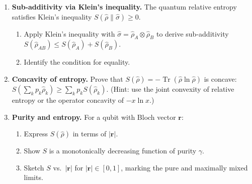 \documentclass[11pt,a4paper]{article}
\begin{document}
\begin{tcolorbox}[gradprobbox, title={Part B --- Entropy and Information \hfill\normalfont 3 problems}]

\begin{enumerate}[leftmargin=1.8em, label=\textbf{B\arabic*.}, itemsep=12pt]

\item {}
  \textbf{Sub-additivity via Klein's inequality.}
  The quantum relative entropy satisfies Klein's inequality
  $S(\hat{\rho}\|\hat{\sigma})\ge 0$.
  \begin{enumerate}[label=(\alph*)]
    \item Apply Klein's inequality with $\hat{\sigma}=\hat{\rho}_A\otimes\hat{\rho}_B$
          to derive sub-additivity $S(\hat{\rho}_{AB})\le S(\hat{\rho}_A)+S(\hat{\rho}_B)$.
    \item Identify the condition for equality.
  \end{enumerate}

\item {}
  \textbf{Concavity of entropy.}
  Prove that $S(\hat{\rho})=-\operatorname{Tr}(\hat{\rho}\ln\hat{\rho})$ is concave:
  $S(\sum_k p_k\hat{\rho}_k)\ge\sum_k p_k S(\hat{\rho}_k)$.
  (Hint: use the joint convexity of relative entropy or the operator concavity of $-x\ln x$.)

\item {}
  \textbf{Purity and entropy.}
  For a qubit with Bloch vector $\mathbf{r}$:
  \begin{enumerate}[label=(\alph*)]
    \item Express $S(\hat{\rho})$ in terms of $|\mathbf{r}|$.
    \item Show $S$ is a monotonically decreasing function of purity $\gamma$.
    \item Sketch $S$ vs.\ $|\mathbf{r}|$ for $|\mathbf{r}|\in[0,1]$,
          marking the pure and maximally mixed limits.
  \end{enumerate}

\end{enumerate}
\end{tcolorbox}
\end{document}
